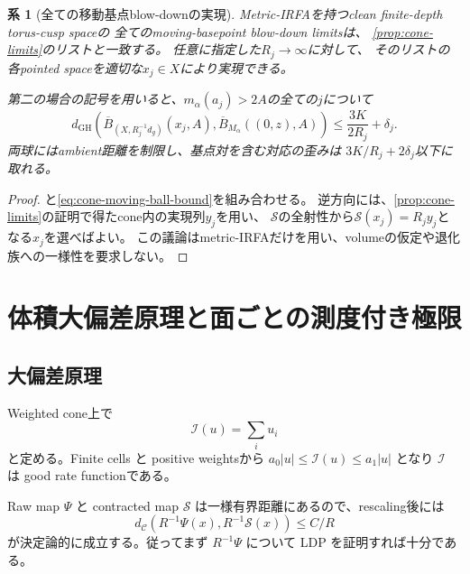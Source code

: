 \documentclass[11pt,a4paper]{ltjsarticle}
\newcommand{\GH}{\operatorname{GH}}
\newcommand{\cC}{\mathcal C}
\newcommand{\cI}{\mathcal I}
\newcommand{\cS}{\mathcal S}
\newcommand{\ov}{\overline}
\theoremstyle{plain}
\newtheorem{corollary}[corollary]{系}
\theoremstyle{definition}
\theoremstyle{remark}
\begin{document}
\begin{corollary}[全ての移動基点blow-downの実現]
\label{cor:moving-limit-classification}
Metric-IRFAを持つclean finite-depth torus-cusp spaceの
全てのmoving-basepoint blow-down limitsは、
\cref{prop:cone-limits}のリストと一致する。
任意に指定した$R_j\to\infty$に対して、
そのリストの各pointed spaceを適切な$x_j\in X$により実現できる。

第二の場合の記号を用いると、$m_\alpha(a_j)>2A$の全ての$j$について
\[
 d_{\GH}\!\left(
 \ov B_{(X,R_j^{-1}d_g)}(x_j,A),
 \ov B_{M_\alpha}((0,z),A)
 \right)
 \le\frac{3K}{2R_j}+\delta_j.
\]
両球にはambient距離を制限し、基点対を含む対応の歪みは
$3K/R_j+2\delta_j$以下に取れる。
\end{corollary}
\begin{proof}
と\cref{eq:cone-moving-ball-bound}を組み合わせる。
逆方向には、\cref{prop:cone-limits}の証明で得たcone内の実現列$y_j$を用い、
$\cS$の全射性から$\cS(x_j)=R_jy_j$となる$x_j$を選べばよい。
この議論はmetric-IRFAだけを用い、volumeの仮定や退化族への一様性を要求しない。
\end{proof}

\section{体積大偏差原理と面ごとの測度付き極限}
\label{sec:measure}

\subsection{大偏差原理}
Weighted cone上で
\[
 \cI(u)=\sum_i u_i
\]
と定める。Finite cells と positive weightsから $a_0|u|\le\cI(u)\le a_1|u|$ となり $\cI$ は good rate functionである。

Raw map $\Psi$ と contracted map $\cS$ は一様有界距離にあるので、rescaling後には
\begin{equation}
\label{eq:exp-equivalence}
 d_\cC(R^{-1}\Psi(x),R^{-1}\cS(x))\le C/R
\end{equation}
が決定論的に成立する。従ってまず $R^{-1}\Psi$ について LDP を証明すれば十分である。
\end{document}
